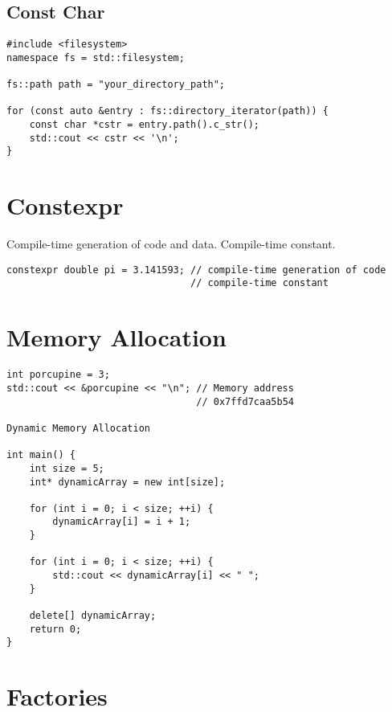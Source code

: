 \subsection{Const Char}

\begin{verbatim}
#include <filesystem>
namespace fs = std::filesystem;

fs::path path = "your_directory_path";

for (const auto &entry : fs::directory_iterator(path)) {
    const char *cstr = entry.path().c_str();
    std::cout << cstr << '\n';
}
\end{verbatim}

\section{Constexpr}

Compile-time generation of code and data. Compile-time constant.

\begin{verbatim}
constexpr double pi = 3.141593; // compile-time generation of code
                                // compile-time constant
\end{verbatim}

\section{Memory Allocation}

\begin{verbatim}
int porcupine = 3;
std::cout << &porcupine << "\n"; // Memory address
                                 // 0x7ffd7caa5b54

Dynamic Memory Allocation

int main() {
    int size = 5;
    int* dynamicArray = new int[size];

    for (int i = 0; i < size; ++i) {
        dynamicArray[i] = i + 1;
    }

    for (int i = 0; i < size; ++i) {
        std::cout << dynamicArray[i] << " ";
    }

    delete[] dynamicArray;
    return 0;
}
\end{verbatim}

\section{Factories}

